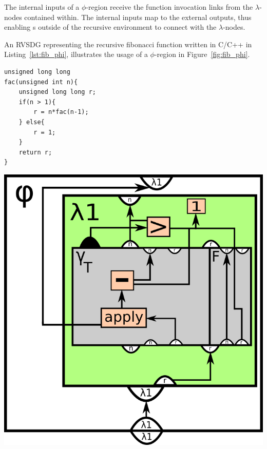 \begin{itemize}
The internal inputs of a $\phi$-region receive the function invocation links
from the $\lambda$-nodes contained within. The internal inputs map to the
external outputs, thus enabling \applyNode s outside of the recursive
environment to connect with the $\lambda$-nodes.

An RVSDG representing the recursive fibonacci function written in C/C++ in
Listing~\ref{lst:fib_phi}, illustrates the usage of a $\phi$-region in
Figure~\ref{fig:fib_phi}.

\begin{centering}
	\noindent\begin{minipage}{0.37\textwidth}
		\begin{CenteredBox}
		\begin{lstlisting}[label={lst:recursive_factorial_func_ex},
style=minipage_customcpp]
unsigned long long
fac(unsigned int n){
	unsigned long long r;
	if(n > 1){
		r = n*fac(n-1);
	} else{
		r = 1;
	}
	return r;
}
		\end{lstlisting}
		\end{CenteredBox}
	\end{minipage}
	\noindent\begin{minipage}{0.55\textwidth}
		\captionsetup{type=figure}
		\includegraphics[width=\textwidth]{figures/recursive_factorial_func_ex}
	\end{minipage}
	\label{fig:recursive_factorial_func_ex}
\end{centering}

\end{itemize}
